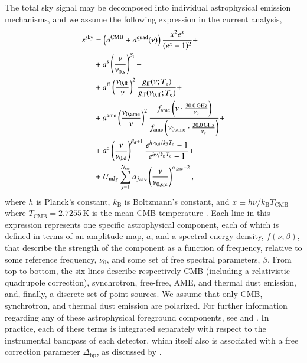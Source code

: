 \documentclass[twocolumn]{aa}
\newcommand{\Te}[0]{T_{\rm e}}
\newcommand{\Dbp}[0]{\Delta_{\mathrm{bp}}}
\def\Tdust{\ifmmode T_\mathrm{d}\else $T_{\mathrm{d}}$\fi}
\def\bdust{\ifmmode \beta_\mathrm{d}\else $\beta_{\mathrm{d}}$\fi}
\def\bsynch{\ifmmode \beta_\mathrm{s}\else $\beta_{\mathrm{s}}$\fi}
\def\nuzeros{\ifmmode \nu_{0,\mathrm{s}}\else $\nu_{0,\mathrm{s}}$\fi}
\def\nuzeroff{\ifmmode \nu_{0,\mathrm{ff}}\else $\nu_{0,\mathrm{ff}}$\fi}
\def\nuzerod{\ifmmode \nu_{0,\mathrm{d}}\else $\nu_{0,\mathrm{d}}$\fi}
\def\nuzeroame{\ifmmode \nu_{0,\mathrm{ame}}\else $\nu_{0,\mathrm{ame}}$\fi}
\def\nuzerosrc{\ifmmode \nu_{0,\mathrm{src}}\else $\nu_{0,\mathrm{src}}$\fi}
\def\nup{\ifmmode \nu_{\mathrm{p}}\else $\nu_{\mathrm{p}}$\fi}
\def\Te{\ifmmode T_{\mathrm{e}}\else $T_{\mathrm{e}}$\fi}
\def\kB{\ifmmode k_\mathrm{B}\else $k_{\mathrm{B}}$\fi}
\begin{document}
The total sky signal may be decomposed into individual astrophysical
emission mechanisms, and we assume the following expression in the
current analysis,
\begin{align}
  s^{\mathrm{sky}} &= \left(a^{\mathrm{CMB}}+a^{\mathrm{quad}}(\nu)\right) \frac{x^2 e^x}{(e^x -1)^2}+\label{eq:cmb_astsky}\\
  &+ a^{\mathrm{s}} \left(\frac{\nu}{\nuzeros}\right)^{\bsynch} + \label{eq:synch_astsky}\\
  &+ a^{\mathrm{ff}} \left(\frac{\nuzeroff}{\nu}\right)^2 \frac{g_{\mathrm{ff}}(\nu;\Te) }{g_{\mathrm{ff}}(\nuzeroff;\Te)} +\label{eq:ff_astsky}\\
  &+ a^{\mathrm{ame}} \left(\frac{\nuzeroame}{\nu}\right)^2 \frac{f_{\mathrm{ame}} \left(\nu\cdot \frac{30.0\,\mathrm{GHz}}{\nup}\right)}{f_{\mathrm{ame}} \left(\nuzeroame\cdot \frac{30.0\,\mathrm{GHz}}{\nup}\right)}+ \label{eq:ame_astsky}\\  
  &+ a^{\mathrm{d}} \left(\frac{\nu}{\nuzerod}\right)^{\bdust+1} \frac{e^{h\nuzerod/\kB\Tdust}-1}{e^{h\nu/\kB\Tdust}-1}+ \label{eq:dust_astsky}\\
  &+ U_{\mathrm{mJy}} \sum_{j=1}^{N_{\mathrm{src}}} a_{j,\mathrm{src}} \left(\frac{\nu}{\nuzerosrc}\right)^{\alpha_{j,\mathrm{src}}-2}, \label{eq:ptsrc_astsky}
\end{align}
where $h$ is Planck's constant, $k_\mathrm{B}$ is Boltzmann's
constant, and $x\equiv h\nu/k_{\mathrm{B}}T_{\mathrm{CMB}}$ where
$T_{\mathrm{CMB}}=2.7255\,\mathrm{K}$ is the mean CMB temperature
\citep{fixsen2009}. Each line in this expression represents one
specific astrophysical component, each of which is defined in terms of
an amplitude map, $a$, and a spectral energy density, $f(\nu; \beta)$,
that describe the strength of the component as a function of
frequency, relative to some reference frequency, $\nu_0$, and some set
of free spectral parameters, $\beta$. From top to bottom, the six
lines describe respectively CMB (including a relativistic quadrupole
correction), synchrotron, free-free, AME, and thermal dust emission,
and, finally, a discrete set of point sources. We assume that only
CMB, synchrotron, and thermal dust emission are polarized.  For further
information regarding any of these astrophysical foreground
components, see \citet{bp13} and \citet{bp14}. In practice, each of these terms is
integrated separately with respect to the instrumental bandpass of
each detector, which itself also is associated with a free correction
parameter $\Dbp$, as discussed by \citet{bp09}.
\end{document}

